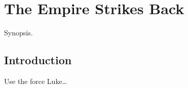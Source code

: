 \chapter{The Empire Strikes Back} \label{chapter:empire-strikes-back}


\begin{synopsis}

Synopsis.

\end{synopsis}

\section{Introduction}\label{introduction}

Use the force Luke\ldots{}
